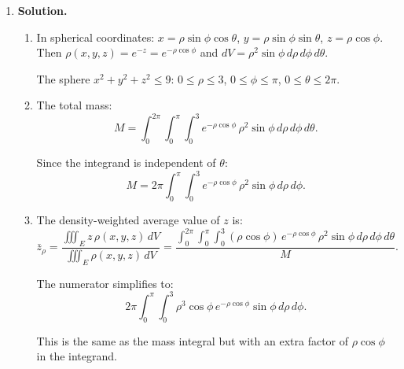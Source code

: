\begin{enumerate}
\begin{enumerate}
\item The product of inertia $I_{xy} = \iiint_E xy\,\rho\,dV = \int_0^{2\pi}\int_0^2\int_{-1}^3 r^2\cos\theta\sin\theta(2+z)\,r\,dz\,dr\,d\theta$.

The $\theta$-integral contains $\int_0^{2\pi}\cos\theta\sin\theta\,d\theta = \frac{1}{2}\int_0^{2\pi}\sin 2\theta\,d\theta = 0$.

Therefore $I_{xy} = 0$. This is because the cylinder has full rotational symmetry about the $z$-axis, and the density $\rho = 2+z$ depends only on $z$, not on $\theta$. The integrand $xy = r^2\cos\theta\sin\theta$ is odd under the reflections $\theta\to\pi-\theta$ or $\theta\to -\theta$, so it vanishes upon integration over a full period.
\end{enumerate}

\item \textbf{Solution.}
\begin{enumerate}
\item In spherical coordinates: $x = \rho\sin\phi\cos\theta$, $y = \rho\sin\phi\sin\theta$, $z = \rho\cos\phi$. Then $\rho(x,y,z) = e^{-z} = e^{-\rho\cos\phi}$ and $dV = \rho^2\sin\phi\,d\rho\,d\phi\,d\theta$.

The sphere $x^2+y^2+z^2\le 9$: $0\le\rho\le 3$, $0\le\phi\le\pi$, $0\le\theta\le 2\pi$.

\item The total mass:
\[
\boxed{M = \int_0^{2\pi}\int_0^\pi\int_0^3 e^{-\rho\cos\phi}\,\rho^2\sin\phi\,d\rho\,d\phi\,d\theta}.
\]

Since the integrand is independent of $\theta$:
\[
M = 2\pi\int_0^\pi\int_0^3 e^{-\rho\cos\phi}\,\rho^2\sin\phi\,d\rho\,d\phi.
\]

\item The density-weighted average value of $z$ is:
\[
\bar{z}_\rho = \frac{\iiint_E z\,\rho(x,y,z)\,dV}{\iiint_E\rho(x,y,z)\,dV} = \frac{\int_0^{2\pi}\int_0^\pi\int_0^3(\rho\cos\phi)\,e^{-\rho\cos\phi}\,\rho^2\sin\phi\,d\rho\,d\phi\,d\theta}{M}.
\]

The numerator simplifies to:
\[
2\pi\int_0^\pi\int_0^3\rho^3\cos\phi\,e^{-\rho\cos\phi}\sin\phi\,d\rho\,d\phi.
\]

This is the same as the mass integral but with an extra factor of $\rho\cos\phi$ in the integrand.
\end{enumerate}

\end{enumerate}
